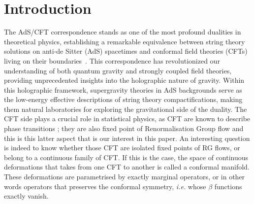 \documentclass[11pt,a4paper]{article}
\newcommand{\ce}[1]{\marginpar{\parbox{\marginparwidth}{\boldmath $\Longleftarrow$}}{\boldmath\bfseries (ce: #1)}}
\begin{document}
\section{Introduction}

The AdS/CFT correspondence stands as one of the most profound dualities in theoretical physics, establishing a remarkable equivalence between string theory solutions on anti-de Sitter (AdS) spacetimes and conformal field theories (CFTs) living on their boundaries~\cite{Maldacena:1997re}. This correspondence has revolutionized our understanding of both quantum gravity and strongly coupled field theories, providing unprecedented insights into the holographic nature of gravity. Within this holographic framework, supergravity theories in AdS backgrounds serve as the low-energy effective descriptions of string theory compactifications, making them natural laboratories for exploring the gravitational side of the duality. The CFT side plays a crucial role in statistical physics, as CFT are known to describe phase transitions ; they are also fixed point of Renormalisation Group flow and this is this latter aspect that is our interest in this paper. An interesting question is indeed to know whether those CFT are isolated fixed points of RG flows, or belong to a continuous family of CFT. If this is the case, the space of continuous deformations that takes from one CFT to another is called a conformal manifold. These deformations are parametrised by exactly marginal operators, or in other words operators that preserves the conformal symmetry, \textit{i.e.} whose $\beta$ functions exactly vanish. \ce{Needs some modifications.}
\end{document}
